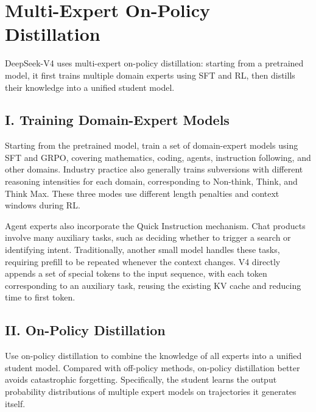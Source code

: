 \setcounter{section}{5}

\hypertarget{multi-expert-on-policy-distillation}{%
\section{Multi-Expert On-Policy Distillation}\label{multi-expert-on-policy-distillation}}

DeepSeek-V4 uses multi-expert on-policy distillation: starting from a pretrained model, it first trains multiple domain experts using SFT and RL, then distills their knowledge into a unified student model.

\hypertarget{i.-training-domain-expert-models}{%
\subsection{I. Training Domain-Expert Models}\label{i.-training-domain-expert-models}}

Starting from the pretrained model, train a set of domain-expert models using SFT and GRPO, covering mathematics, coding, agents, instruction following, and other domains. Industry practice also generally trains subversions with different reasoning intensities for each domain, corresponding to Non-think, Think, and Think Max. These three modes use different length penalties and context windows during RL.

Agent experts also incorporate the Quick Instruction mechanism. Chat products involve many auxiliary tasks, such as deciding whether to trigger a search or identifying intent. Traditionally, another small model handles these tasks, requiring prefill to be repeated whenever the context changes. V4 directly appends a set of special tokens to the input sequence, with each token corresponding to an auxiliary task, reusing the existing KV cache and reducing time to first token.

\hypertarget{ii.-on-policy-distillation}{%
\subsection{II. On-Policy Distillation}\label{ii.-on-policy-distillation}}

Use on-policy distillation to combine the knowledge of all experts into a unified student model. Compared with off-policy methods, on-policy distillation better avoids catastrophic forgetting. Specifically, the student learns the output probability distributions of multiple expert models on trajectories it generates itself.

